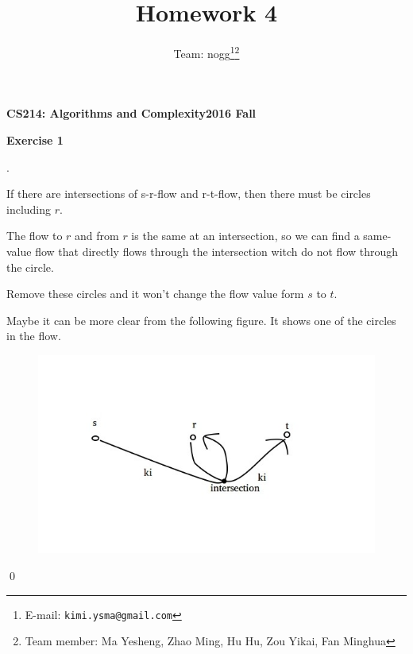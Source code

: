 \documentclass[12pt, notitlepage]{article}
\title{Homework 4}
\author{Team: nogg\footnote{E-mail: \texttt{kimi.ysma@gmail.com}}\footnote{Team member: Ma Yesheng, Zhao Ming, Hu Hu, Zou Yikai, Fan Minghua}}
\newenvironment{sol}
  {\par\vspace{3mm}\noindent{\it Solution}.}{\qed}
\begin{document}
{\bf\small CS214: Algorithms and Complexity}\hfill{\bf\small 2016 Fall}
{\let\newpage\relax\maketitle}

\textbf{Exercise 1}
\begin{sol}
	
\qquad If there are intersections of s-r-flow and r-t-flow, then there must be circles including $r$.

\qquad The flow to $r$ and from $r$ is the same at an intersection, so we can find a same-value flow that directly flows through the intersection witch do not flow through the circle.

\qquad Remove these circles and it won't change the flow value form $s$ to $t$.

\qquad Maybe it can be more clear from the following figure. It shows one of the circles in the flow.
\begin{figure}[H]
	\center
	\includegraphics[width=0.6\linewidth]{1-1.jpg}\vspace{-10pt}
	\nonumber\vspace{-10pt}
\end{figure}
\end{sol}\\
\end{document}
